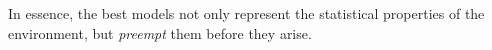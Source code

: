 \begin{CJK}{UTF8}{gbsn}
    In essence, the best models not only represent the statistical properties of the environment, but \textit{preempt} them before they arise.







\end{CJK}
